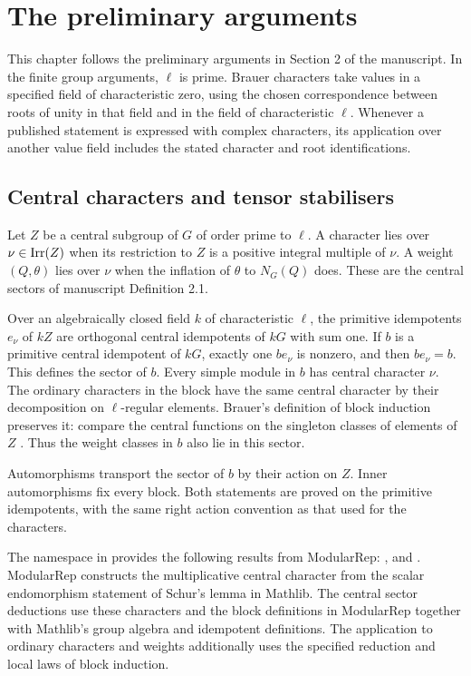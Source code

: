 \chapter{The preliminary arguments}
\label{chap:current-preliminaries}

This chapter follows the preliminary arguments in Section 2 of the
manuscript. In the finite group arguments, $\ell$ is prime. Brauer
characters take values in a specified field of characteristic zero,
using the chosen correspondence between roots of unity in that field
and in the field of characteristic $\ell$. Whenever a published
statement is expressed with complex characters, its application over
another value field includes the stated character and root
identifications.

\section{Central characters and tensor stabilisers}

Let $Z$ be a central subgroup of $G$ of order prime to $\ell$.
A character lies over $\nu\in\operatorname{Irr}(Z)$ when its restriction to $Z$
is a positive integral multiple of $\nu$. A weight $(Q,\theta)$
lies over $\nu$ when the inflation of $\theta$ to $N_G(Q)$ does.
These are the central sectors of manuscript Definition 2.1.

Over an algebraically closed field $k$ of characteristic $\ell$,
the primitive idempotents $e_\nu$ of $kZ$ are orthogonal central
idempotents of $kG$ with sum one. If $b$ is a primitive central
idempotent of $kG$, exactly one $be_\nu$ is nonzero, and then
$be_\nu=b$. This defines the sector of $b$. Every simple module
in $b$ has central character $\nu$. The ordinary characters in
the block have the same central character by their decomposition
on $\ell$-regular elements. Brauer's definition of block induction
preserves it: compare the central functions on the singleton
classes of elements of $Z$ \cite[Definition~2.1]{Spath2013}.
Thus the weight classes in $b$ also lie in this sector.

Automorphisms transport the sector of $b$ by their action on $Z$.
Inner automorphisms fix every block. Both statements are proved
on the primitive idempotents, with the same right action convention
as that used for the characters.

\begin{implementation}
The  namespace in
 provides the following results from ModularRep:
,
 and
.
ModularRep constructs the multiplicative central character from the scalar
endomorphism statement of Schur's lemma in Mathlib. The central sector
deductions use these characters and the block definitions in
ModularRep together with Mathlib's group algebra and idempotent definitions.
The application to ordinary characters and weights additionally uses the specified reduction and local laws of
block induction.
\end{implementation}

